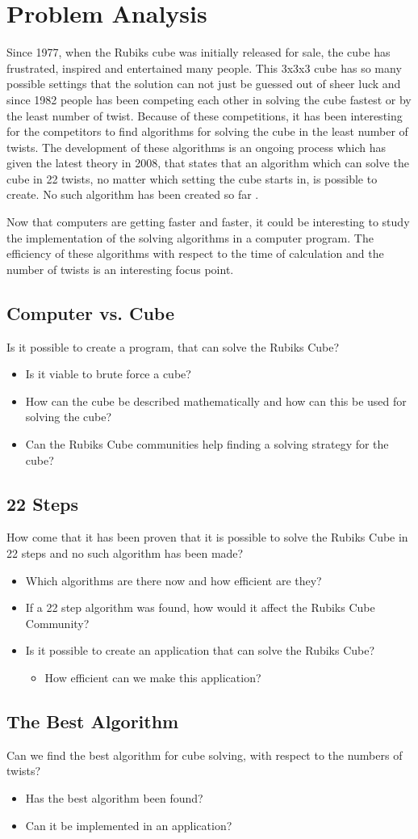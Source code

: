 \documentclass{report}
\begin{document}
\chapter{Problem Analysis}
Since 1977, when the Rubiks cube was initially released for sale, the cube has frustrated, inspired and entertained many people. This 3x3x3 cube has so many possible settings that the solution can not just be guessed out of sheer luck and since 1982 people has been competing each other in solving the cube fastest or by the least number of twist. Because of these competitions, it has been interesting for the competitors to find algorithms for solving the cube in the least number of twists. The development of these algorithms is an ongoing process which has given the latest theory in 2008, that states that an algorithm which can solve the cube in 22 twists, no matter which setting the cube starts in, is possible to create. No such algorithm has been created so far \cite{}.

Now that computers are getting faster and faster, it could be interesting to study the implementation of the solving algorithms in a computer program. The efficiency of these algorithms with respect to the time of calculation and the number of twists is an interesting focus point.

\section{Computer vs. Cube}
Is it possible to create a program, that can solve the Rubiks Cube?
\begin{itemize}
	\item Is it viable to brute force a cube?
	\item How can the cube be described mathematically and how can this be used for solving the cube?
	\item Can the Rubiks Cube communities help finding a solving strategy for the cube?
\end{itemize}

\section{22 Steps}
How come that it has been proven that it is possible to solve the Rubiks Cube in 22 steps and no such algorithm has been made?
\begin{itemize}
	\item Which algorithms are there now and how efficient are they?
	\item If a 22 step algorithm was found, how would it affect the Rubiks Cube Community?
	\item Is it possible to create an application that can solve the Rubiks Cube?
	\begin{itemize}
		\item How efficient can we make this application?
	\end{itemize}
\end{itemize}

\section{The Best Algorithm}
Can we find the best algorithm for cube solving, with respect to the numbers of twists?
\begin{itemize}
	\item Has the best algorithm been found?
	\item Can it be implemented in an application?
\end{itemize}
\end{document}
